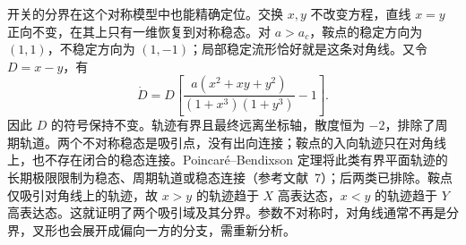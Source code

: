 开关的分界在这个对称模型中也能精确定位。交换 $x,y$ 不改变方程，直线 $x=y$ 正向不变，在其上只有一维恢复到对称稳态。对 $a>a_c$，鞍点的稳定方向为 $(1,1)$，不稳定方向为 $(1,-1)$；局部稳定流形恰好就是这条对角线。又令 $D=x-y$，有
\[
\dot D=D\left[\frac{a(x^2+xy+y^2)}{(1+x^3)(1+y^3)}-1\right].
\]
因此 $D$ 的符号保持不变。轨迹有界且最终远离坐标轴，散度恒为 $-2$，排除了周期轨道。两个不对称稳态是吸引点，没有出向连接；鞍点的入向轨迹只在对角线上，也不存在闭合的稳态连接。Poincar\'e--Bendixson 定理将此类有界平面轨迹的长期极限限制为稳态、周期轨道或稳态连接（参考文献~7）；后两类已排除。鞍点仅吸引对角线上的轨迹，故 $x>y$ 的轨迹趋于 $X$ 高表达态，$x<y$ 的轨迹趋于 $Y$ 高表达态。这就证明了两个吸引域及其分界。参数不对称时，对角线通常不再是分界，叉形也会展开成偏向一方的分支，需重新分析。


